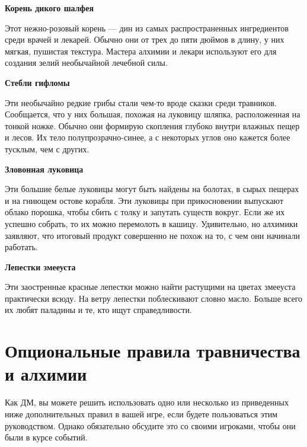 \documentclass[a4paper, 9pt, twocolumn]{book}
\begin{document}
	\medspace
	
	\noindent \textbf{Корень дикого шалфея}
	
	\smallskip
	
	\noindent Этот нежно-розовый корень --- дин из самых распространенных ингредиентов среди врачей и лекарей. Обычно они от трех до пяти дюймов в длину, у них мягкая, пушистая текстура. Мастера алхимии и лекари используют его для создания зелий необычайной лечебной силы.
	
	\medspace
	
	\noindent \textbf{Стебли гифломы}
	
	\smallskip
	
	\noindent Эти необычайно редкие грибы стали чем-то вроде сказки среди травников. Сообщается, что у них большая, похожая на луковицу шляпка, расположенная на тонкой ножке. Обычно они формирую скопления глубоко внутри влажных пещер и лесов. Их тело полупрозрачно-синее, а с некоторых углов оно кажется более тусклым, чем с других.
	
	\medspace
	
	\noindent \textbf{Зловонная луковица}
	
	\smallskip
	
	\noindent Эти большие белые луковицы могут быть найдены на болотах, в сырых пещерах и на гниющем остове корабля. Эти луковицы при прикосновении выпускают облако порошка, чтобы сбить с толку и запутать существ вокруг. Если же их успешно собрать, то их можно перемолоть в кашицу. Удивительно, но алхимики заявляют, что итоговый продукт совершенно не похож на то, с чем они начинали работать.
	
	\medspace
	
	\noindent \textbf{Лепестки змееуста}
	
	\smallskip
	
	\noindent Эти заостренные красные лепестки можно найти растущими на цветах змееуста практически всюду. На ветру лепестки поблескивают словно масло. Больше всего их любят паладины и те, кто ищут справедливости.
	
	
	\chapter{Опциональные правила травничества и алхимии}
	
	Как ДМ, вы можете решить использовать одно или несколько из приведенных ниже дополнительных правил в вашей игре, если будете пользоваться этим руководством. Однако обязательно обсудите это со своими игроками, чтобы они были в курсе событий.
	
\end{document}
